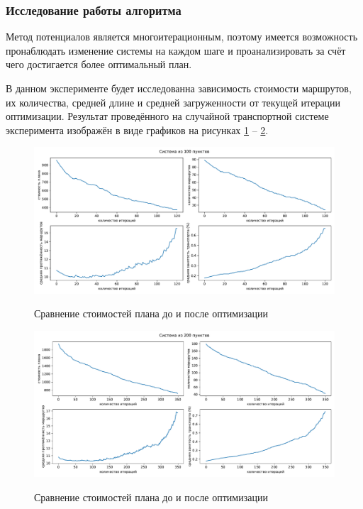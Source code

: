 \subsubsection{Исследование работы алгоритма}
Метод потенциалов является многоитерационным, поэтому имеется возможность пронаблюдать изменение системы на каждом шаге и проанализировать за счёт чего достигается более оптимальный план. 

В данном эксперименте будет исследованна зависимость стоимости маршрутов, их количества, средней длине и средней загруженности от текущей итерации оптимизации. Результат проведённого на случайной транспортной системе эксперимента изображён в виде графиков на рисунках \ref{exp:iter100} -- \ref{exp:iter200}.

\begin{figure}[h!]
	\begin{center}
		{\includegraphics[scale=0.5, angle=0, page=1]{research/one_case_100.pdf}}
		\caption{Сравнение стоимостей плана до и после оптимизации}
		\label{exp:iter100}
	\end{center}
\end{figure}

\begin{figure}[h!]
	\begin{center}
		{\includegraphics[scale=0.5, angle=0, page=1]{research/one_case_200.pdf}}
		\caption{Сравнение стоимостей плана до и после оптимизации}
		\label{exp:iter200}
	\end{center}
\end{figure}

